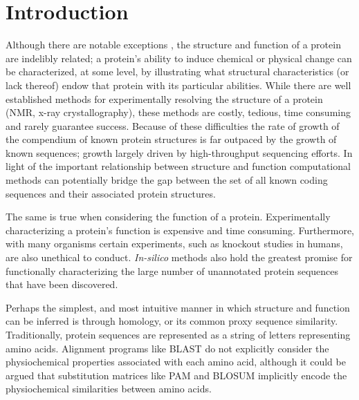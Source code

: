\section{Introduction}

Although there are notable exceptions \citep{Dunker2001a,Dunker2001}, the structure and function of a protein  are indelibly related; a protein's ability to induce chemical or physical change can be characterized, at some level, by  illustrating what structural characteristics (or lack thereof) endow that protein with its particular abilities.  While there are well established methods for experimentally resolving the structure of a protein (NMR, x-ray crystallography), these methods are costly, tedious, time consuming and rarely guarantee success.  Because of these difficulties the rate of growth of the compendium of known protein structures is far outpaced by the growth of known sequences; growth largely driven by high-throughput sequencing efforts.  In light of the important relationship between structure and function computational methods can potentially bridge the gap between the set of all known coding sequences and their associated protein structures.


The same is true when considering the function of a protein.  Experimentally characterizing a protein's function is expensive and time consuming.  Furthermore, with many organisms certain experiments, such as knockout studies in humans, are also unethical to conduct.  \emph{In-silico} methods also hold the greatest promise for functionally characterizing the large number of unannotated protein sequences that have been discovered.

Perhaps the simplest, and most intuitive manner in which structure and function can be inferred is through homology, or its common proxy sequence similarity. Traditionally, protein sequences are represented as a string of letters representing amino acids.  Alignment programs like BLAST \citep{Altschul1990} do not explicitly consider the physiochemical properties associated with each amino acid, although it could be argued that substitution matrices like PAM \citep{Dayhoff1978} and BLOSUM \citep{Henikoff1992} implicitly encode the physiochemical similarities between amino acids.  

